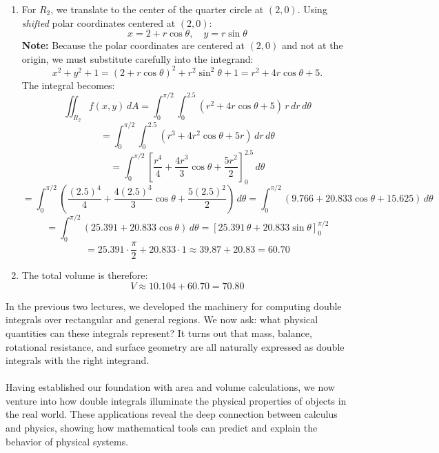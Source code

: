 \begin{example}
\begin{solution}
\begin{enumerate}
\begin{enumerate}
\item For $R_2$, we translate to the center of the quarter circle at $(2,0)$. Using \emph{shifted} polar coordinates centered at $(2,0)$:
\[
x = 2 + r\cos\theta, \quad y = r\sin\theta
\]
\textbf{Note:} Because the polar coordinates are centered at $(2,0)$ and not at the origin, we must substitute carefully into the integrand:
\[
x^2 + y^2 + 1 = (2+r\cos\theta)^2 + r^2\sin^2\theta + 1 = r^2 + 4r\cos\theta + 5.
\]
The integral becomes:
\[
\iint_{R_2} f(x,y)\,dA = \int_0^{\pi/2} \int_0^{2.5} (r^2 + 4r\cos\theta + 5)\,r\,dr\,d\theta
\]
\[
= \int_0^{\pi/2} \int_0^{2.5} (r^3 + 4r^2\cos\theta + 5r)\,dr\,d\theta
\]
\[
= \int_0^{\pi/2} \left[\frac{r^4}{4} + \frac{4r^3}{3}\cos\theta + \frac{5r^2}{2}\right]_0^{2.5}\,d\theta
\]
\[
= \int_0^{\pi/2} \left(\frac{(2.5)^4}{4} + \frac{4(2.5)^3}{3}\cos\theta + \frac{5(2.5)^2}{2}\right)\,d\theta
= \int_0^{\pi/2} \left(9.766 + 20.833\cos\theta + 15.625\right)\,d\theta
\]
\[
= \int_0^{\pi/2} \left(25.391 + 20.833\cos\theta\right)\,d\theta
= \left[25.391\,\theta + 20.833\sin\theta\right]_0^{\pi/2}
\]
\[
= 25.391 \cdot \frac{\pi}{2} + 20.833 \cdot 1 \approx 39.87 + 20.83 = 60.70
\]

\item The total volume is therefore:
\[
V \approx 10.104 + 60.70 = 70.80
\]
\end{enumerate}
\end{enumerate}
\end{solution}
\end{example}
\exampleline



\newpage


\noindent In the previous two lectures, we developed the machinery for computing double integrals over rectangular and general regions. We now ask: what physical quantities can these integrals represent? It turns out that mass, balance, rotational resistance, and surface geometry are all naturally expressed as double integrals with the right integrand.\\ \\

\noindent Having established our foundation with area and volume calculations, we now venture into how double integrals illuminate the physical properties of objects in the real world. These applications reveal the deep connection between calculus and physics, showing how mathematical tools can predict and explain the behavior of physical systems.

